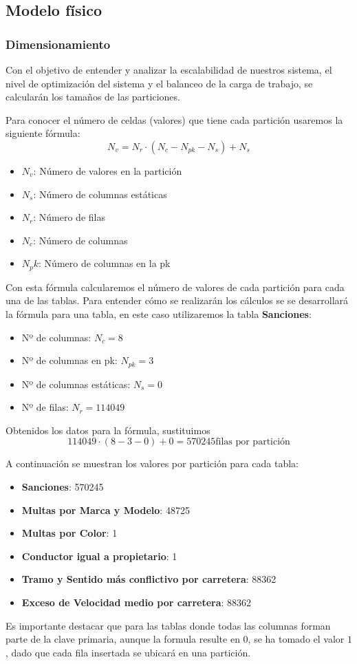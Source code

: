 \documentclass[]{article}
\begin{document}
\subsection{Modelo físico}
\label{subsec:modelo_fisico}
\subsubsection{Dimensionamiento}
\label{subsubsec:dimensionamiento}
Con el objetivo de entender y analizar la escalabilidad de nuestros sistema, el nivel de optimización del sistema y el balanceo de la carga de trabajo, se calcularán los tamaños de las particiones.

Para conocer el número de celdas (valores) que tiene cada partición usaremos la siguiente fórmula: $$N_v = N_r \cdot (N_c - N_{pk} - N_s) + N_s$$
\begin{itemize}
    \item $N_v$: Número de valores en la partición
    \item $N_s$: Número de columnas estáticas
    \item $N_r$: Número de filas
    \item $N_c$: Número de columnas
    \item $N_pk$: Número de columnas en la pk
\end{itemize}

Con esta fórmula calcularemos el número de valores de cada partición para cada una de las tablas. Para entender cómo se realizarán los cálculos se se desarrollará la fórmula para una tabla, en este caso utilizaremos la tabla \textbf{Sanciones}:
\begin{itemize}
    \item Nº de columnas: $N_c = 8$
    \item Nº de columnas en pk: $N_{pk} = 3$
    \item Nº de columnas estáticas: $N_s= 0$
    \item Nº de filas: $N_r = 114049$
\end{itemize}

Obtenidos los datos para la fórmula, sustituimos $$114049 \cdot (8 - 3 - 0) + 0 = 570245 \text{filas por partición}$$

A continuación se muestran los valores por partición para cada tabla:
\begin{itemize}
    \item \textbf{Sanciones}: 570245
    \item \textbf{Multas por Marca y Modelo}: 48725
    \item \textbf{Multas por Color}: 1
    \item \textbf{Conductor igual a propietario}: 1
    \item \textbf{Tramo y Sentido más conflictivo por carretera}: 88362
    \item \textbf{Exceso de Velocidad medio por carretera}: 88362
\end{itemize}
Es importante destacar que para las tablas donde todas las columnas forman parte de la clave primaria, aunque la formula resulte en $0$, se ha tomado el valor $1$, dado que cada fila insertada se ubicará en una partición.
\end{document}
